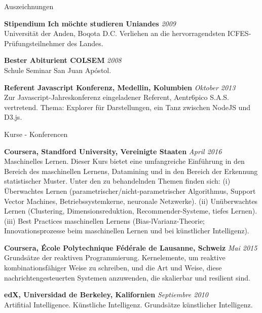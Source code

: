 \documentclass[spanish]{resume} %
\begin{document}
\begin{rSection}{Auszeichnungen}

{\bf Stipendium Ich m{\"o}chte studieren Uniandes} \hfill {\em 2009} \\
Universit{\"a}t der Anden, Boqota D.C. 
Verliehen an die hervorragendsten ICFES-Pr{\"u}fungsteilnehmer des Landes.

{\bf Bester Abiturient COLSEM} \hfill {\em 2008} \\
Schule Seminar San Juan Ap\'ostol.

{\bf Referent Javascript Konferenz, Medellin, Kolumbien} \hfill {\em Oktober 2013} \\
Zur Javascript-Jahreskonferenz eingeladener Referent, Aentr6pico S.A.S. vertretend. 
Thema: Explorer f{\"u}r Darstellungen, ein Tanz zwischen NodeJS und D3.js.

\end{rSection}


\begin{rSection}{Kurse - Konferencen}


{\bf Coursera, Standford University, Vereinigte Staaten} \hfill {\em April 2016} \\
Maschinelles Lernen. Dieser Kurs bietet eine umfangreiche Einf{\"u}hrung in den Bereich des maschinellen Lernens, Datamining und in den Bereich der Erkennung statistischer Muster. Unter den zu behandelnden Themen finden sich: (i) {\"U}berwachtes Lernen (parametrischer/nicht-parametrischer Algorithmus, Support Vector Machines, Betriebssystemkerne, neuronale Netzwerke). (ii) Un{\"u}berwachtes Lernen (Clustering, Dimensionsreduktion, Recommender-Systeme, tiefes Lernen). (iii) Best Practices maschinellen Lernens (Bias-lVarianz-Theorie; Innovationsprozesse beim maschinellen Lernen und bei k{\"u}nstlicher Intelligenz).

{\bf Coursera, \'Ecole Polytechnique F\'ed\'erale de Lausanne, Schweiz} \hfill {\em Mai 2015} \\
Grunds{\"a}tze der reaktiven Programmierung. Kernelemente, um reaktive kombinationsfähiger Weise zu schreiben, und die Art und Weise, diese nachrichtengesteuerten Systemen anzuwenden, die skalierbar und resilient sind.

{\bf edX, Universidad de Berkeley, Kalifornien} \hfill {\em Septiembre 2010} \\
Artifitial Intelligence.
K{\"u}nstliche Intelligenz. Grunds{\"a}tze k{\"u}nstlicher Intelligenz.

\end{rSection}
\end{document}
